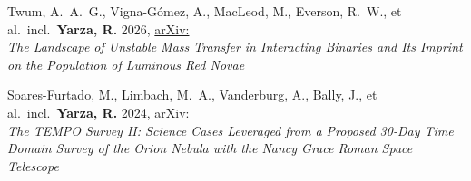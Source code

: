 \item Twum, A.~A.~G., Vigna-Gómez, A., MacLeod, M., Everson, R.~W., et al.\ incl.\ \textbf{Yarza, R.} 2026, \href{https://ui.adsabs.harvard.edu/abs/2026arXiv260210211T}{arXiv:}\\\textit{The Landscape of Unstable Mass Transfer in Interacting Binaries and Its Imprint on the Population of Luminous Red Novae}

\item Soares-Furtado, M., Limbach, M.~A., Vanderburg, A., Bally, J., et al.\ incl.\ \textbf{Yarza, R.} 2024, \href{https://ui.adsabs.harvard.edu/abs/2024arXiv240601492S}{arXiv:}\\\textit{The TEMPO Survey II\@: Science Cases Leveraged from a Proposed 30-Day Time Domain Survey of the Orion Nebula with the Nancy Grace Roman Space Telescope}

